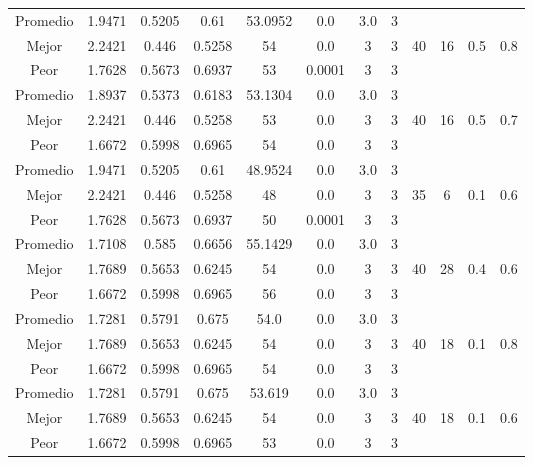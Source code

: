 \begin{table}[h!]
\begin{center}
\begin{tabular}{|c|c|c|c|c|c|c|c|c|c|c|c|}
        \hline
        \hline
            Promedio  & 1.9471 & 0.5205 & 0.61 & 53.0952 & 0.0 & 3.0 & 3 &  &  &  & \\
            \cline{1-8}
            Mejor & 2.2421 & 0.446  & 0.5258 & 54 & 0.0 & 3 & 3 & 40 & 16 & 0.5 & 0.8\\
            \cline{1-8}
            Peor & 1.7628 & 0.5673  & 0.6937 & 53 & 0.0001 & 3 & 3 &  &  &  & \\
        \hline
        \hline
            Promedio  & 1.8937 & 0.5373 & 0.6183 & 53.1304 & 0.0 & 3.0 & 3 &  &  &  & \\
            \cline{1-8}
            Mejor & 2.2421 & 0.446  & 0.5258 & 53 & 0.0 & 3 & 3 & 40 & 16 & 0.5 & 0.7\\
            \cline{1-8}
            Peor & 1.6672 & 0.5998  & 0.6965 & 54 & 0.0 & 3 & 3 &  &  &  & \\
        \hline
        \hline
            Promedio  & 1.9471 & 0.5205 & 0.61 & 48.9524 & 0.0 & 3.0 & 3 &  &  &  & \\
            \cline{1-8}
            Mejor & 2.2421 & 0.446  & 0.5258 & 48 & 0.0 & 3 & 3 & 35 & 6 & 0.1 & 0.6\\
            \cline{1-8}
            Peor & 1.7628 & 0.5673  & 0.6937 & 50 & 0.0001 & 3 & 3 &  &  &  & \\
        \hline
        \hline
            Promedio  & 1.7108 & 0.585 & 0.6656 & 55.1429 & 0.0 & 3.0 & 3 &  &  &  & \\
            \cline{1-8}
            Mejor & 1.7689 & 0.5653  & 0.6245 & 54 & 0.0 & 3 & 3 & 40 & 28 & 0.4 & 0.6\\
            \cline{1-8}
            Peor & 1.6672 & 0.5998  & 0.6965 & 56 & 0.0 & 3 & 3 &  &  &  & \\
        \hline
        \hline
            Promedio  & 1.7281 & 0.5791 & 0.675 & 54.0 & 0.0 & 3.0 & 3 &  &  &  & \\
            \cline{1-8}
            Mejor & 1.7689 & 0.5653  & 0.6245 & 54 & 0.0 & 3 & 3 & 40 & 18 & 0.1 & 0.8\\
            \cline{1-8}
            Peor & 1.6672 & 0.5998  & 0.6965 & 54 & 0.0 & 3 & 3 &  &  &  & \\
        \hline
        \hline
            Promedio  & 1.7281 & 0.5791 & 0.675 & 53.619 & 0.0 & 3.0 & 3 &  &  &  & \\
            \cline{1-8}
            Mejor & 1.7689 & 0.5653  & 0.6245 & 54 & 0.0 & 3 & 3 & 40 & 18 & 0.1 & 0.6\\
            \cline{1-8}
            Peor & 1.6672 & 0.5998  & 0.6965 & 53 & 0.0 & 3 & 3 &  &  &  & \\

\end{tabular}
\end{center}
\end{table}
